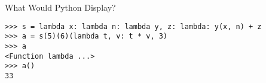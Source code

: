 \begin{blocksection}
\question What Would Python Display?
\newline
\begin{lstlisting}
>>> s = lambda x: lambda n: lambda y, z: lambda: y(x, n) + z
>>> a = s(5)(6)(lambda t, v: t * v, 3)
>>> a
<Function lambda ...>
>>> a()
33
\end{lstlisting}
\begin{solution}
\end{solution}
\end{blocksection}